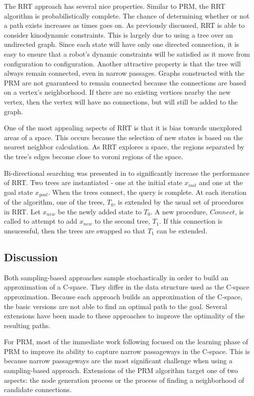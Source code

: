 \documentclass[10pt,conference]{ieeeconf}
\begin{document}
The RRT approach has several nice properties. Similar to PRM, the RRT algorithm is probabilistically complete. The chance of determining whether or not a path exists increases as times goes on. As previously discussed, RRT is able to consider kinodynamic constraints. This is largely due to using a tree over an undirected graph. Since each state will have only one directed connection, it is easy to ensure that a robot's dynamic constraints will be satisfied as it move from configuration to configuration. Another attractive property is that the tree will always remain connected, even in narrow passages. Graphs constructed with the PRM are not guaranteed to remain connected because the connections are based on a vertex's neighborhood. If there are no existing vertices nearby the new vertex, then the vertex will have no connections, but will still be added to the graph.

One of the most appealing aspects of RRT is that it is bias towards unexplored areas of a space. This occurs because the selection of new states is based on the nearest neighbor calculation. As RRT explores a space, the regions separated by the tree's edges become close to voroni regions of the space.

Bi-directional searching was presented in \cite{kuffner2000rrt} to significantly increase the performance of RRT. Two trees are instantiated - one at the initial state $x_{init}$ and one at the goal state $x_{goal}$. When the trees connect, the query is complete. At each iteration of the algorithm, one of the trees, $T_0$, is extended by the usual set of procedures in RRT. Let $x_{new}$ be the newly added state to $T_0$. A new procedure, $Connect$, is called to attempt to add $x_{new}$ to the second tree, $T_1$. If this connection is unsucessful, then the trees are swapped so that $T_1$ can be extended.


\subsection{Discussion}

Both sampling-based approaches sample stochastically in order to build an approximation of a C-space. They differ in the data structure used as the C-space approximation. Because each approach builds an approximation of the C-space, the basic versions are not able to find an optimal path to the goal. Several extensions have been made to these approaches to improve the optimality of the resulting paths.

For PRM, most of the immediate work following \cite{PRM} focused on the learning phase of PRM to improve its ability to capture narrow passageways in the C-space. This is because narrow passageways are the most significant challenge when using a sampling-based approach. Extensions of the PRM algorithm target one of two aspects: the node generation process or the process of finding a neighborhood of candidate connections. 
\end{document}
